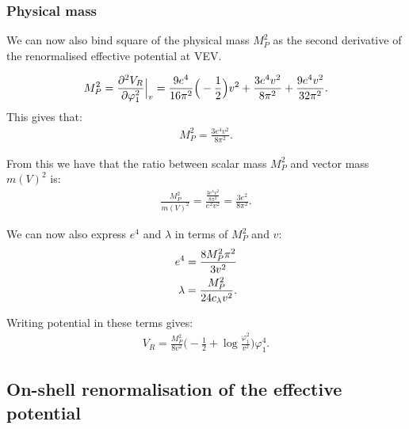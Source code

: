 \subsubsection{Physical mass}\label{MSbar physical mass}
We can now also bind square of the physical mass $M_P^2$ as the second derivative of the 
renormalised effective potential at VEV.

\begin{align}
M_P^2 = \frac{\partial^2 V_R}{\partial \varphi_1^2} \Big|_v = \frac{9e^4}{16\pi^2}\Big(-\frac{1}{2}\Big)v^2+\frac{3e^4v^2}{8\pi^2} 
+\frac{9e^4v^2}{32\pi^2}.
\end{align}
This gives that:
\begin{align}
M_P^2 = \frac{3e^4v^2}{8\pi^2}.
\end{align}

From this we have that the ratio between scalar mass $M_P^2$ and vector mass $m(V)^2$ is:
\begin{align}
\frac{M_P^2}{m(V)^2} = \frac{\frac{3e^4v^2}{8\pi^2}}{e^2v^2} = \frac{3e^2}{8\pi^2}.
\end{align}

We can now also express $e^4$ and $\lambda$ in terms of $M_P^2$ and $v$:
\begin{align}
e^4 = \frac{8M_P^2\pi^2}{3v^2} \\
\lambda = \frac{M_P^2}{24c_\lambda v^2}.
\end{align}

Writing potential in these terms gives:
\begin{align}
V_R = \frac{M_P^2}{8v^2}\Big(-\frac{1}{2}+\log\frac{\varphi_1^2}{v^2}\Big)\varphi_1^4.
\end{align}


\subsection{On-shell renormalisation of the effective potential}















